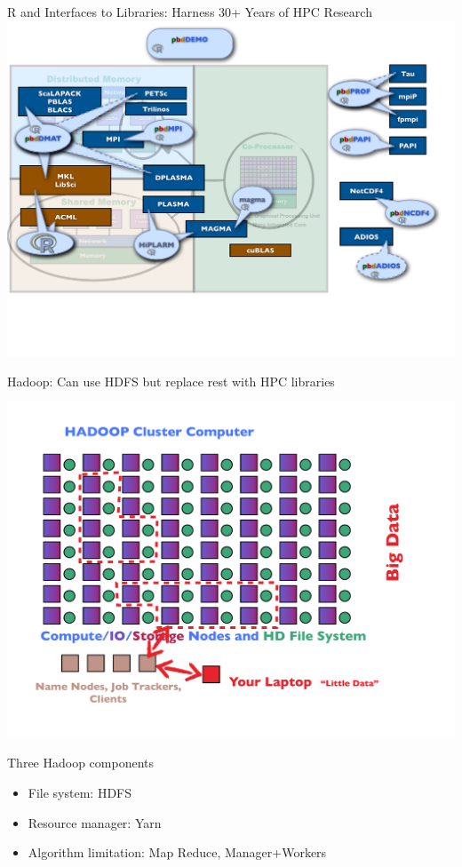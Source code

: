 \begin{frame}{R and \pbdR Interfaces to Libraries: Harness 30+ Years of
    HPC Research}
\includegraphics[width=1.35\textheight]
{../common/pics/hardware/ParallelHardware14.pdf}
\end{frame}

\begin{frame}{Hadoop: Can use HDFS but replace rest with HPC libraries}
\begin{minipage}{10cm}
  \includegraphics[width=1.25\textheight]
  {../common/pics/hardware/ParallelHardware23.pdf}
\end{minipage}
\begin{minipage}{5cm}\small
  \begin{block}{Three Hadoop components}\pause
    \begin{itemize}[<+-|alert@+>]
    \item File system: HDFS
    \item Resource manager: Yarn
    \item Algorithm limitation: Map Reduce, Manager+Workers
    \end{itemize}
  \end{block}
\end{minipage}
\end{frame}


